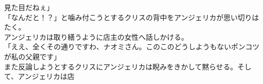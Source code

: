 \documentclass[b5j,10pt,openany]{jsbook}
\begin{document}
見た目だねぇ」\\「なんだと！？」と噛み付こうとするクリスの背中をアンジェリカが思い切りはたく。\\アンジェリカは取り繕うように店主の女性へ話しかける。\\「ええ、全くその通りですわ、ナオミさん。このこのどうしようもないポンコツが私の父親です」\\また反論しようとするクリスにアンジェリカは睨みをきかして黙らせる。そして、アンジェリカは店
\end{document}
